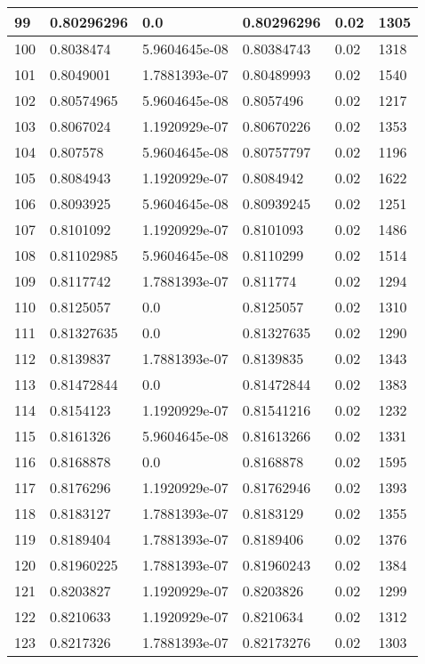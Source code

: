 \begin{longtable}{|l|l|l|l|l|l|}
99 & 0.80296296 & 0.0 & 0.80296296 & 0.02 & 1305 \\ \hline 
100 & 0.8038474 & 5.9604645e-08 & 0.80384743 & 0.02 & 1318 \\ \hline 
101 & 0.8049001 & 1.7881393e-07 & 0.80489993 & 0.02 & 1540 \\ \hline 
102 & 0.80574965 & 5.9604645e-08 & 0.8057496 & 0.02 & 1217 \\ \hline 
103 & 0.8067024 & 1.1920929e-07 & 0.80670226 & 0.02 & 1353 \\ \hline 
104 & 0.807578 & 5.9604645e-08 & 0.80757797 & 0.02 & 1196 \\ \hline 
105 & 0.8084943 & 1.1920929e-07 & 0.8084942 & 0.02 & 1622 \\ \hline 
106 & 0.8093925 & 5.9604645e-08 & 0.80939245 & 0.02 & 1251 \\ \hline 
107 & 0.8101092 & 1.1920929e-07 & 0.8101093 & 0.02 & 1486 \\ \hline 
108 & 0.81102985 & 5.9604645e-08 & 0.8110299 & 0.02 & 1514 \\ \hline 
109 & 0.8117742 & 1.7881393e-07 & 0.811774 & 0.02 & 1294 \\ \hline 
110 & 0.8125057 & 0.0 & 0.8125057 & 0.02 & 1310 \\ \hline 
111 & 0.81327635 & 0.0 & 0.81327635 & 0.02 & 1290 \\ \hline 
112 & 0.8139837 & 1.7881393e-07 & 0.8139835 & 0.02 & 1343 \\ \hline 
113 & 0.81472844 & 0.0 & 0.81472844 & 0.02 & 1383 \\ \hline 
114 & 0.8154123 & 1.1920929e-07 & 0.81541216 & 0.02 & 1232 \\ \hline 
115 & 0.8161326 & 5.9604645e-08 & 0.81613266 & 0.02 & 1331 \\ \hline 
116 & 0.8168878 & 0.0 & 0.8168878 & 0.02 & 1595 \\ \hline 
117 & 0.8176296 & 1.1920929e-07 & 0.81762946 & 0.02 & 1393 \\ \hline 
118 & 0.8183127 & 1.7881393e-07 & 0.8183129 & 0.02 & 1355 \\ \hline 
119 & 0.8189404 & 1.7881393e-07 & 0.8189406 & 0.02 & 1376 \\ \hline 
120 & 0.81960225 & 1.7881393e-07 & 0.81960243 & 0.02 & 1384 \\ \hline 
121 & 0.8203827 & 1.1920929e-07 & 0.8203826 & 0.02 & 1299 \\ \hline 
122 & 0.8210633 & 1.1920929e-07 & 0.8210634 & 0.02 & 1312 \\ \hline 
123 & 0.8217326 & 1.7881393e-07 & 0.82173276 & 0.02 & 1303 \\ \hline 

\end{longtable}
